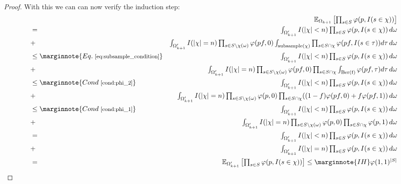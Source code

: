 \begin{proof}
With this we can can now verify the induction step:
\begin{eqnarray*}
&  & \textstyle\expect_{\Omega_{k+1}}\left[\prod_{s \in S} \phi(p, I(s \in \chi))\right]  \\
& = & \textstyle \int_{\Omega'_{k+1}} I(|\chi|<n)\prod_{s\in S} \phi(p, I(s \in \chi)) \, d \omega\\
& + & \textstyle \int_{\Omega'_{k+1}} I(|\chi|=n)
  \prod_{s \in S \setminus \chi(\omega)} \phi(pf,0)
    \int_{\mathrm{subsample}(\chi)} \prod_{s \in S \cap \chi} \phi(pf,I(s \in \tau )) d \tau \, d \omega \\
& \leq \marginnote{\footnotesize Eq.~\ref{eq:subsample_condition}} & \textstyle \int_{\Omega'_{k+1}}
  I(|\chi| < n)\prod_{s \in S} \phi(p, I(s \in \chi)) \, d \omega \\
& + & \textstyle \int_{\Omega'_{k+1}} I(|\chi| = n) \prod_{s \in S \setminus \chi(\omega)}
  \phi(pf,0) \prod_{s \in S \cap \chi} \int_{\mathrm{Ber(f)}} \phi(pf,\tau) d \tau \, d \omega  \\
& \leq \marginnote{\footnotesize Cond~\ref{cond:phi_2}}  &
  \textstyle \int_{\Omega'_{k+1}} I(|\chi| < n)\prod_{s \in S} \phi(p, I(s \in \chi)) \, d \omega \\
& + & \textstyle \int_{\Omega'_{k+1}} I(|\chi| = n) \prod_{s \in S \setminus \chi(\omega)}
  \phi(p,0) \prod_{s \in S \cap \chi} ((1-f)\phi(pf,0)+f\phi(pf,1)) \, d \omega  \\
& \leq \marginnote{\footnotesize Cond~\ref{cond:phi_1}} & \textstyle \int_{\Omega'_{k+1}} I(|\chi| < n)
  \prod_{s \in S} \phi(p, I(s \in \chi)) \, d \omega \\
& + & \textstyle \int_{\Omega'_{k+1}} I(|\chi| = n) \prod_{s \in S \setminus \chi(\omega)}
  \phi(p,0) \prod_{s \in S \cap \chi} \phi(p,1) \, d \omega \\
& = & \textstyle \int_{\Omega'_{k+1}} I(|\chi|<n)\prod_{s \in S} \phi(p,I(s\in\chi)) \, d\omega \\
& + & \textstyle \int_{\Omega'_{k+1}} I(|\chi|=n)\prod_{s \in S} \phi(p,I(s\in\chi)) \, d\omega \\
& = & \textstyle \expect_{\Omega'_{k+1}}\left[\prod_{s \in S} \phi(p, I(s \in \chi)) \right]
  \leq  \marginnote{\footnotesize IH} \phi(1,1)^{|S|}
\end{eqnarray*}
\end{proof}

